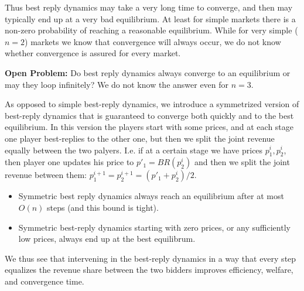 {Thus best reply dynamics may take a very long time to converge, and then may typically
end up at a very bad equilibrium.  At least for simple markets there is a non-zero
probability of reaching a reasonable equilibrium.  While for very simple ($n=2$) markets
we know that convergence will always occur, we do not know whether convergence
is assured for every market.

\vspace{0.1in}
\noindent
{\bf Open Problem:} Do best reply dynamics always converge to an equilibrium or may
they loop infinitely?  We do not know the answer even for $n=3$.
\vspace{0.1in}

As opposed to simple best-reply dynamics, we introduce a symmetrized version of
best-reply dynamics that is guaranteed to converge both quickly and to the best equilibrium.
In this version the players start with some prices, and at each stage one player best-replies
to the other one, but then we split the joint revenue equally between the two palyers.
I.e. if at a certain stage we have prices $p_1^i,p_2^i$, then player one updates his price
to $p'_1 = BR(p_2^i)$ and then we split the joint
revenue between them: $p_1^{i+1}=p_2^{i+1}=(p'_1+p_2^i)/2$.

\begin{theorem}
\begin{itemize}
\item
Symmetric best reply dynamics always reach an equilibrium after at most $O(n)$ steps
(and this bound is tight).
\item
Symmetric best-reply dynamics starting with zero prices, or any sufficiently low prices,
always end up at the best equilibrum.
\end{itemize}
\end{theorem}

We thus see that intervening in the best-reply dynamics in a way that every step
equalizes the revenue share between the two bidders improves efficiency, welfare, and
convergence time.


} %
